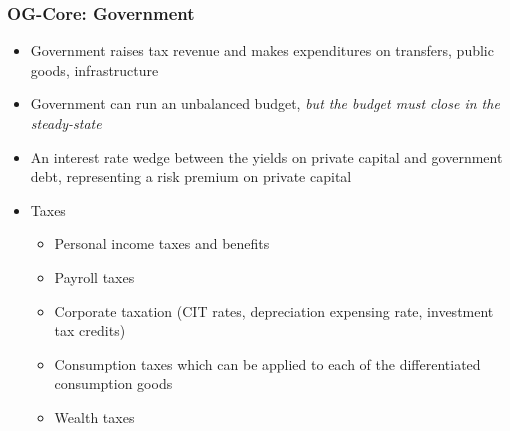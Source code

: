 \documentclass{beamer}
\begin{document}
  \begin{frame}
    \frametitle{OG-Core: Government}
    \begin{itemize}
      \item Government raises tax revenue and makes expenditures on transfers, public goods, infrastructure
      \item Government can run an unbalanced budget, \emph{but the budget must close in the steady-state}
      \item An interest rate wedge between the yields on private capital and government debt, representing a risk premium on private capital
      \item Taxes
      \begin{itemize}
        \item Personal income taxes and benefits
        \item Payroll taxes
        \item Corporate taxation (CIT rates, depreciation expensing rate, investment tax credits)
        \item Consumption taxes which can be applied to each of the differentiated consumption goods
        \item Wealth taxes
      \end{itemize}
    \end{itemize}
  \end{frame}
\end{document}
